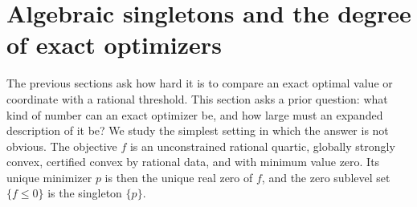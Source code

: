 \section{Algebraic singletons and the degree of exact optimizers}
\label{sec:algebraic}

The previous sections ask how hard it is to compare an exact optimal value or
coordinate with a rational threshold. This section asks a prior question:
what kind of number can an exact optimizer be, and how large must an expanded
description of it be? We study the simplest setting in which the answer is not
obvious. The objective $f$ is an unconstrained rational quartic, globally
strongly convex, certified convex by rational data, and with minimum value
zero. Its unique minimizer $p$ is then the unique real zero of $f$, and the
zero sublevel set $\{f\le0\}$ is the singleton $\{p\}$.

